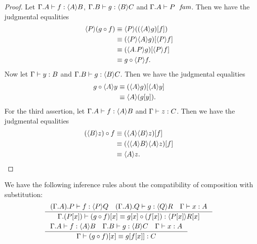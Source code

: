\begin{proof}
Let $\jhom{\Gamma}{A}{B}{f}$, $\jhom{\Gamma}{B}{C}{g}$ and $\jfam{{\Gamma}{A}}{P}$.
Then we have the judgmental equalities
\begin{align*}
\ctxwk{P}{\jcomp{f}{g}} 
& \jdeq \ctxwk{P}{\subst{f}{\ctxwk{A}{g}}}\\
& \jdeq \subst{\ctxwk{P}{f}}{\ctxwk{P}{{A}{g}}}\\
& \jdeq \subst{\ctxwk{P}{f}}{\ctxwk{\ctxext{A}{P}}{g}}\\
& \jdeq \jcomp{\ctxwk{P}{f}}{g}.
\end{align*}
Now let $\jterm{\Gamma}{B}{y}$ and $\jhom{\Gamma}{B}{C}{g}$. Then we have the
judgmental equalities
\begin{align*}
\jcomp{\ctxwk{A}{y}}{g}
& \jdeq \subst{\ctxwk{A}{y}}{\ctxwk{A}{g}}\\
& \jdeq \ctxwk{A}{\subst{y}{g}}.
\end{align*}
For the third assertion, let $\jhom{\Gamma}{A}{B}{f}$ and $\jterm{\Gamma}{C}{z}$.
Then we have the judgmental equalities
\begin{align*}
\jcomp{f}{\ctxwk{B}{z}} 
& \jdeq \subst{f}{\ctxwk{A}{{B}{z}}}\\
& \jdeq \subst{f}{\ctxwk{{A}{B}}{{A}{z}}}\\
& \jdeq \ctxwk{A}{z}.
\end{align*}
\end{proof}

\begin{lem}
We have the following inference rules about the compatibility of composition with
substitution:
\begin{align*}
& \inference
  {\jhom{{\Gamma}{A}}{P}{Q}{f}
   \jhom{{\Gamma}{A}}{Q}{R}{g}
   \jterm{\Gamma}{A}{x}}
  {\jhomeq{\Gamma}{\subst{x}{P}}{\subst{x}{R}}
    {\subst{x}{\jcomp{f}{g}}}
    {\jcomp{\subst{x}{f}}{\subst{x}{g}}}}\\
& \inference
  {\jhom{\Gamma}{A}{B}{f}
   \jhom{\Gamma}{B}{C}{g}
   \jterm{\Gamma}{A}{x}}
  {\jtermeq{\Gamma}{C}
    {\subst{x}{\jcomp{f}{g}}}
    {\subst{{x}{f}}{g}}}
\end{align*}
\end{lem}

